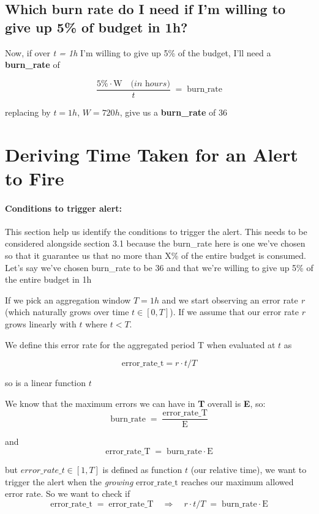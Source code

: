 \documentclass{article}
\begin{document}
\subsection{Which burn rate do I need if I'm willing to give up 5\% of budget in 1h?}

Now, if over \emph{t = 1h} I'm willing to give up 5\% of the budget, I'll need a \textbf{burn\_rate} of

\[
\frac{5\% \cdot \mathrm{W} \quad \textit{(in hours)}}{t} \;=\; \mathrm{burn\_rate}
\]

replacing by $t = 1h$, $W = 720h$, give us a \textbf{burn\_rate} of 36

\section{Deriving Time Taken for an Alert to Fire}

\paragraph{Conditions to trigger alert:}
This section help us identify the conditions to trigger the alert. This needs to be considered alongside section 3.1 because the burn\_rate here is one we've chosen so that it guarantee us that no more than X\% of the entire budget is consumed. Let's say we've chosen burn\_rate to be 36 and that we're willing to give up 5\% of the entire budget in 1h

\quad

\noindent If we pick an aggregation window $T = 1h$ and we start observing an error rate \emph{r} (which naturally grows over time $t \in [0, T]$). If we assume that our error rate $r$ grows linearly with $t$ where $t < T$.

\quad

We define this error rate for the aggregated period T when evaluated at $t$ as

\[
\mathrm{error\_rate\_t} = r \cdot t/T
\]

so is a linear function $t$

\quad

We know that the maximum errors we can have in \textbf{T} overall is \textbf{E}, so:
\[
\mathrm{burn\_rate} \;=\; \frac{\mathrm{error\_rate\_T}}{\mathrm{E}}
\]

and
\[
\mathrm{error\_rate\_T} \;=\; \mathrm{burn\_rate} \cdot \mathrm{E}
\]

but $error\_rate\_t \in [1, T]$  is defined as function $t$ (our relative time), we want to trigger the alert when the \emph{growing} $\mathrm{error\_rate\_t}$ reaches our maximum allowed error rate. So we want to check if
\[
\mathrm{error\_rate\_t} \;=\; \mathrm{error\_rate\_T} \quad \Rightarrow \quad r \cdot t/T \;=\; \mathrm{burn\_rate} \cdot \mathrm{E}
\]
\end{document}
